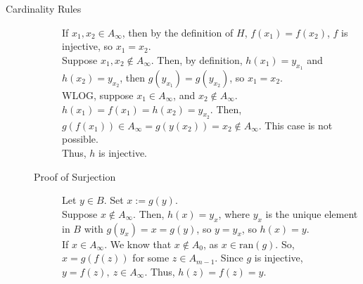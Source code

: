 \documentclass[10pt]{extarticle}
\begin{document}
\begin{problem}{Cardinality Rules}
\begin{description}
\begin{description}
              If $x_1,x_2\in A_{\infty}$, then by the definition of $H$, $f(x_1) = f(x_2)$, $f$ is injective, so $x_1 = x_2$.\\

              Suppose $x_1,x_2\notin A_{\infty}$. Then, by definition, $h(x_1) = y_{x_1}$ and $h(x_2) = y_{x_2}$, then $g(y_{x_1}) = g(y_{x_2})$, so $x_1 = x_2$.\\

              WLOG, suppose $x_1\in A_{\infty}$, and $x_2 \notin A_{\infty}$. $h(x_1) = f(x_1) = h(x_2) = y_{x_2}$. Then, $g(f(x_1))\in A_{\infty} = g(y(x_2)) = x_2\notin A_{\infty}$. This case is not possible.\\

              Thus, $h$ is injective.
            \item[Proof of Surjection] Let $y\in B$. Set $x := g(y)$.\\

              Suppose $x\notin A_{\infty}$. Then, $h(x) = y_x$, where $y_x$ is the unique element in $B$ with $g(y_x)=x=g(y)$, so $y = y_x$, so $h(x) = y$.\\

              If $x\in A_{\infty}$. We know that $x\notin A_0$, as $x\in \text{ran}(g)$. So, $x = g(f(z))$ for some $z\in A_{m-1}$. Since $g$ is injective, $y = f(z),~z\in A_{\infty}$. Thus, $h(z) = f(z) = y$.
          \end{description}
      \end{description}
    \end{problem}
\end{document}
